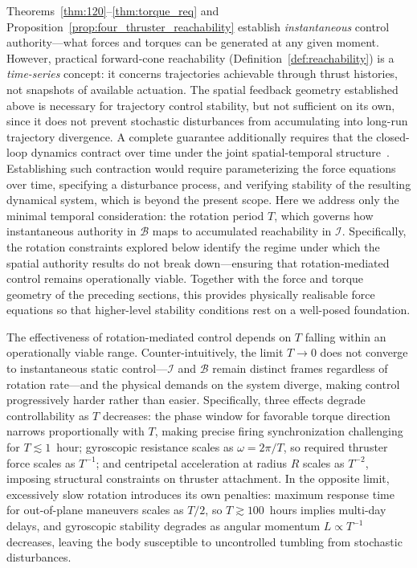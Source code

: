 \documentclass{article}
\begin{document}
Theorems~\ref{thm:120}--\ref{thm:torque_req} and Proposition~\ref{prop:four_thruster_reachability} establish \emph{instantaneous} control authority---what forces and torques can be generated at any given moment. However, practical forward-cone reachability (Definition~\ref{def:reachability}) is a \emph{time-series} concept: it concerns trajectories achievable through thrust histories, not snapshots of available actuation. The spatial feedback geometry established above is necessary for trajectory control stability, but not sufficient on its own, since it does not prevent stochastic disturbances from accumulating into long-run trajectory divergence. A complete guarantee additionally requires that the closed-loop dynamics contract over time under the joint spatial-temporal structure~\cite{andree2020dynamic}. Establishing such contraction would require parameterizing the force equations over time, specifying a disturbance process, and verifying stability of the resulting dynamical system, which is beyond the present scope. Here we address only the minimal temporal consideration: the rotation period $T$, which governs how instantaneous authority in $\mathcal{B}$ maps to accumulated reachability in $\mathcal{I}$. Specifically, the rotation constraints explored below identify the regime under which the spatial authority results do not break down---ensuring that rotation-mediated control remains operationally viable. Together with the force and torque geometry of the preceding sections, this provides physically realisable force equations so that higher-level stability conditions rest on a well-posed foundation.

The effectiveness of rotation-mediated control depends on $T$ falling within an operationally viable range. Counter-intuitively, the limit $T \to 0$ does not converge to instantaneous static control---$\mathcal{I}$ and $\mathcal{B}$ remain distinct frames regardless of rotation rate---and the physical demands on the system diverge, making control progressively harder rather than easier. Specifically, three effects degrade controllability as $T$ decreases: the phase window for favorable torque direction narrows proportionally with $T$, making precise firing synchronization challenging for $T \lesssim 1$~hour; gyroscopic resistance scales as $\omega = 2\pi/T$, so required thruster force scales as $T^{-1}$; and centripetal acceleration at radius $R$ scales as $T^{-2}$, imposing structural constraints on thruster attachment. In the opposite limit, excessively slow rotation introduces its own penalties: maximum response time for out-of-plane maneuvers scales as $T/2$, so $T \gtrsim 100$~hours implies multi-day delays, and gyroscopic stability degrades as angular momentum $L \propto T^{-1}$ decreases, leaving the body susceptible to uncontrolled tumbling from stochastic disturbances.
\end{document}
